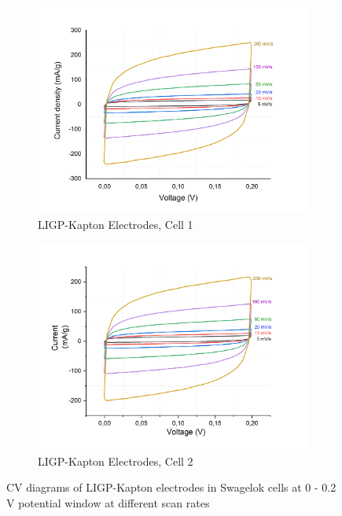 \begin{figure}[H]
\begin{subfigure}{0.49\textwidth}
\includegraphics[width=1\textwidth]{Figures/Results/Electrochemistry/LIGP-PI-NaNO3-Swagelok/Cell1/CV_02V_diff_scan_rates-Cell1.jpg} 
\captionsetup{width=0.9\linewidth}
\caption{LIGP-Kapton Electrodes, Cell 1}
\label{fig:LIG-PI-cell1}
\end{subfigure}
\begin{subfigure}{0.49\textwidth}
\includegraphics[width=1\textwidth]{Figures/Results/Electrochemistry/LIGP-PI-NaNO3-Swagelok/Cell2/CV_02V_diff_scan_rates-Cell2.jpg}
\captionsetup{width=0.9\linewidth}
\caption{LIGP-Kapton Electrodes, Cell 2}
\label{fig:LIGP-PI-cell2}
\end{subfigure}
\medskip
\caption{CV diagrams of LIGP-Kapton electrodes in Swagelok cells at 0 - 0.2 V potential window at different scan rates}
\label{fig:LIGP-PI-CV-02}
\end{figure}

